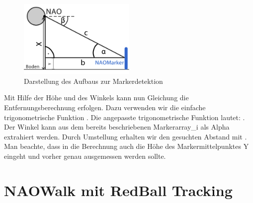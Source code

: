 \begin{figure}[ht]
    \centering
  \includegraphics[width=0.5\textwidth, angle=0]{img/nao_9.png}
    \caption{Darstellung des Aufbaus zur Markerdetektion}
    \label{nao_marker3}
\end{figure}

Mit Hilfe der Höhe und des Winkels kann nun Gleichung die Entfernungsberechnung erfolgen. Dazu verwenden wir die einfache trigonometrische Funktion   .
Die angepasste trigonometrische Funktion lautet:  . Der Winkel  kann aus dem bereits beschriebenen Markerarray\_i als Alpha extrahiert werden. 
Durch Umstellung erhalten wir den gesuchten Abstand mit  . Man beachte, dass in die Berechnung auch die Höhe des Markermittelpunktes Y eingeht und vorher genau ausgemessen werden sollte.

\section{NAOWalk mit RedBall Tracking}

